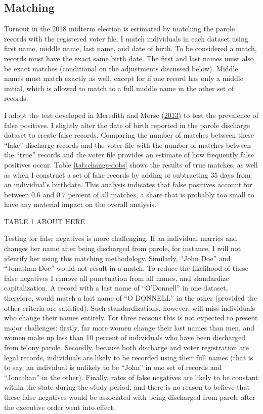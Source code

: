 \documentclass[
  12pt,
]{article}
\begin{document}
\hypertarget{matching}{%
\subsection*{Matching}\label{matching}}

Turnout in the 2018 midterm election is estimated by matching the parole records with the registered voter file. I match individuals in each dataset using first name, middle name, last name, and date of birth. To be considered a match, records must have the exact same birth date. The first and last names must also be exact matches (conditional on the adjustments discussed below). Middle names must match exactly as well, except for if one record has only a middle initial, which is allowed to match to a full middle name in the other set of records.

I adopt the test developed in Meredith and Morse (\protect\hyperlink{ref-Meredith2013}{2013}) to test the prevalence of false positives. I slightly alter the date of birth reported in the parole discharge dataset to create false records. Comparing the number of matches between these ``fake'' discharge records and the voter file with the number of matches between the ``true'' records and the voter file provides an estimate of how frequently false positives occur. Table \ref{tab:change-dobs} shows the results of true matches, as well as when I construct a set of fake records by adding or subtracting 35 days from an individual's birthdate. This analysis indicates that false positives account for between 0.6 and 0.7 percent of all matches, a share that is probably too small to have any material impact on the overall analysis.

TABLE 1 ABOUT HERE

Testing for false negatives is more challenging. If an individual marries and changes her name after being discharged from parole, for instance, I will not identify her using this matching methodology. Similarly, ``John Doe'' and ``Jonathan Doe'' would not result in a match. To reduce the likelihood of these false negatives I remove all punctuation from all names, and standardize capitalization. A record with a last name of ``O'Donnell'' in one dataset, therefore, would match a last name of ``O DONNELL'' in the other (provided the other criteria are satisfied). Such standardizations, however, will miss individuals who change their names entirely. For three reasons this is not expected to present major challenges: firstly, far more women change their last names than men, and women make up less than 10 percent of individuals who have been discharged from felony parole. Secondly, because both discharge and voter registration are legal records, individuals are likely to be recorded using their full names (that is to say, an individual is unlikely to be ``John'' in one set of records and ``Jonathan'' in the other). Finally, rates of false negatives are likely to be constant within the state during the study period, and there is no reason to believe that these false negatives would be associated with being discharged from parole after the executive order went into effect.
\end{document}
